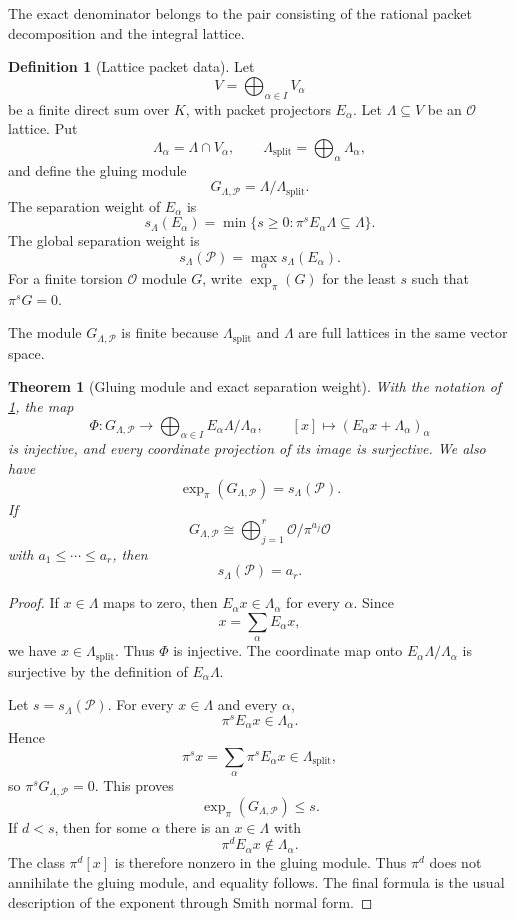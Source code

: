 \documentclass{aomart}
\newtheorem{theorem}{Theorem}[section]
\theoremstyle{definition}
\newtheorem{definition}[definition]{Definition}
\theoremstyle{remark}
\newcommand{\OO}{\mathcal O}
\newcommand{\Pcal}{\mathcal P}
\newcommand{\expn}{\operatorname{exp}}
\begin{document}
The exact denominator belongs to the pair consisting of the rational packet decomposition and the integral lattice.

\begin{definition}[Lattice packet data]\label{def:lattice_packet}
Let
\[
V=\bigoplus_{\alpha\in I}V_\alpha
\]
be a finite direct sum over $K$, with packet projectors $E_\alpha$.  Let $\Lambda\subseteq V$ be an $\OO$ lattice.  Put
\[
\Lambda_\alpha=\Lambda\cap V_\alpha,
\qquad
\Lambda_{\mathrm{split}}=\bigoplus_\alpha\Lambda_\alpha,
\]
and define the gluing module
\[
G_{\Lambda,\Pcal}
=
\Lambda/\Lambda_{\mathrm{split}}.
\]
The separation weight of $E_\alpha$ is
\[
s_\Lambda(E_\alpha)
=
\min\{s\geq0:\pi^sE_\alpha\Lambda\subseteq\Lambda\}.
\]
The global separation weight is
\[
s_\Lambda(\Pcal)=\max_\alpha s_\Lambda(E_\alpha).
\]
For a finite torsion $\OO$ module $G$, write $\expn_\pi(G)$ for the least $s$ such that $\pi^sG=0$.
\end{definition}

The module $G_{\Lambda,\Pcal}$ is finite because $\Lambda_{\mathrm{split}}$ and $\Lambda$ are full lattices in the same vector space.

\begin{theorem}[Gluing module and exact separation weight]\label{thm:gluing_weight}
With the notation of \cref{def:lattice_packet}, the map
\[
\Phi:G_{\Lambda,\Pcal}
\longrightarrow
\bigoplus_{\alpha\in I}E_\alpha\Lambda/\Lambda_\alpha,
\qquad
[x]\longmapsto(E_\alpha x+\Lambda_\alpha)_\alpha
\]
is injective, and every coordinate projection of its image is surjective.  We also have
\[
\boxed{
\expn_\pi(G_{\Lambda,\Pcal})
=
s_\Lambda(\Pcal).
}
\]
If
\[
G_{\Lambda,\Pcal}
\cong
\bigoplus_{j=1}^r\OO/\pi^{a_j}\OO
\]
with $a_1\leq\cdots\leq a_r$, then
\[
s_\Lambda(\Pcal)=a_r.
\]
\end{theorem}

\begin{proof}
If $x\in\Lambda$ maps to zero, then $E_\alpha x\in\Lambda_\alpha$ for every $\alpha$.  Since
\[
x=\sum_\alpha E_\alpha x,
\]
we have $x\in\Lambda_{\mathrm{split}}$.  Thus $\Phi$ is injective.  The coordinate map onto $E_\alpha\Lambda/\Lambda_\alpha$ is surjective by the definition of $E_\alpha\Lambda$.

Let $s=s_\Lambda(\Pcal)$.  For every $x\in\Lambda$ and every $\alpha$,
\[
\pi^sE_\alpha x\in\Lambda_\alpha.
\]
Hence
\[
\pi^sx=\sum_\alpha\pi^sE_\alpha x\in\Lambda_{\mathrm{split}},
\]
so $\pi^sG_{\Lambda,\Pcal}=0$.  This proves
\[
\expn_\pi(G_{\Lambda,\Pcal})\leq s.
\]
If $d<s$, then for some $\alpha$ there is an $x\in\Lambda$ with
\[
\pi^dE_\alpha x\notin\Lambda_\alpha.
\]
The class $\pi^d[x]$ is therefore nonzero in the gluing module.  Thus $\pi^d$ does not annihilate the gluing module, and equality follows.  The final formula is the usual description of the exponent through Smith normal form.
\end{proof}
\end{document}

